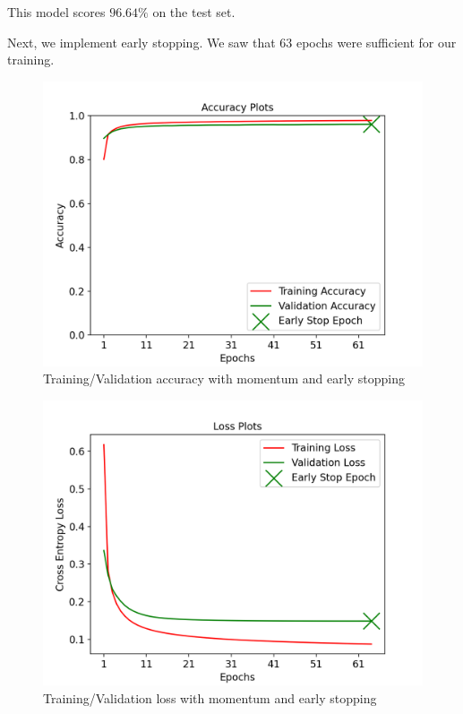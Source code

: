 This model scores $96.64\%$ on the test set.


Next, we implement early stopping. We saw that 63 epochs were sufficient
for our training.

\begin{figure}[!ht]
	\centering
	\includegraphics[width=1.0\textwidth]{./images/accuracy_momentum_early_stop.png}
	\caption{Training/Validation accuracy with momentum and early stopping}
\end{figure}

\begin{figure}[!ht]
	\centering
	\includegraphics[width=1.0\textwidth]{./images/loss_momentum_early_stop.png}
	\caption{Training/Validation loss with momentum and early stopping}
\end{figure}

